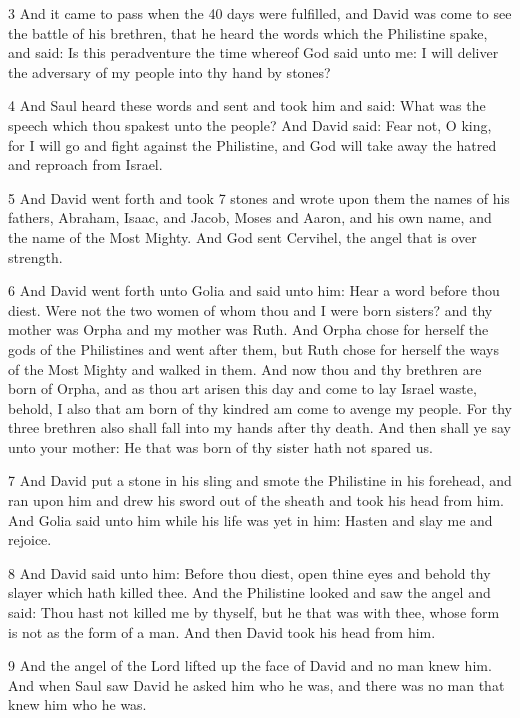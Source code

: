 \par 3 And it came to pass when the 40 days were fulfilled, and David was come to see the battle of his brethren, that he heard the words which the Philistine spake, and said: Is this peradventure the time whereof God said unto me: I will deliver the adversary of my people into thy hand by stones? 

\par 4 And Saul heard these words and sent and took him and said: What was the speech which thou spakest unto the people? And David said: Fear not, O king, for I will go and fight against the Philistine, and God will take away the hatred and reproach from Israel. 

\par 5 And David went forth and took 7 stones and wrote upon them the names of his fathers, Abraham, Isaac, and Jacob, Moses and Aaron, and his own name, and the name of the Most Mighty. And God sent Cervihel, the angel that is over strength. 

\par 6 And David went forth unto Golia and said unto him: Hear a word before thou diest. Were not the two women of whom thou and I were born sisters? and thy mother was Orpha and my mother was Ruth. And Orpha chose for herself the gods of the Philistines and went after them, but Ruth chose for herself the ways of the Most Mighty and walked in them. And now thou and thy brethren are born of Orpha, and as thou art arisen this day and come to lay Israel waste, behold, I also that am born of thy kindred am come to avenge my people. For thy three brethren also shall fall into my hands after thy death. And then shall ye say unto your mother: He that was born of thy sister hath not spared us. 

\par 7 And David put a stone in his sling and smote the Philistine in his forehead, and ran upon him and drew his sword out of the sheath and took his head from him. And Golia said unto him while his life was yet in him: Hasten and slay me and rejoice. 

\par 8 And David said unto him: Before thou diest, open thine eyes and behold thy slayer which hath killed thee. And the Philistine looked and saw the angel and said: Thou hast not killed me by thyself, but he that was with thee, whose form is not as the form of a man. And then David took his head from him. 

\par 9 And the angel of the Lord lifted up the face of David and no man knew him. And when Saul saw David he asked him who he was, and there was no man that knew him who he was.

